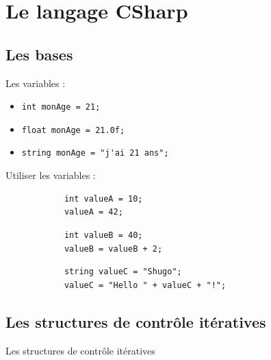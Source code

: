 \documentclass{beamer}
\begin{document}
\section{Le langage CSharp}
\subsection{Les bases}
\begin{frame}
Les variables :
	\begin{itemize}
		\item<1-> \lstinline{int monAge = 21;}
		\item<2-> \lstinline{float monAge = 21.0f;}
		\item<3-> \lstinline{string monAge = "j'ai 21 ans";}
	\end{itemize}
\end{frame}


\begin{frame}[fragile]
Utiliser les variables :

 	\begin{center}
		\begin{lstlisting}
			int valueA = 10;
			valueA = 42;
		\end{lstlisting}
	\end{center}

 	\begin{center}
		\begin{lstlisting}
			int valueB = 40;
			valueB = valueB + 2;
		\end{lstlisting}
	\end{center}

 	\begin{center}
		\begin{lstlisting}
			string valueC = "Shugo";
			valueC = "Hello " + valueC + "!";
		\end{lstlisting}
	\end{center}

\end{frame}

\subsection{Les structures de contr\^{o}le it\'{e}ratives}
\begin{frame}[fragile]
    \begin{center}
        \Huge{Les structures de contr\^{o}le it\'{e}ratives}
    \end{center}
\end{frame}
\end{document}
